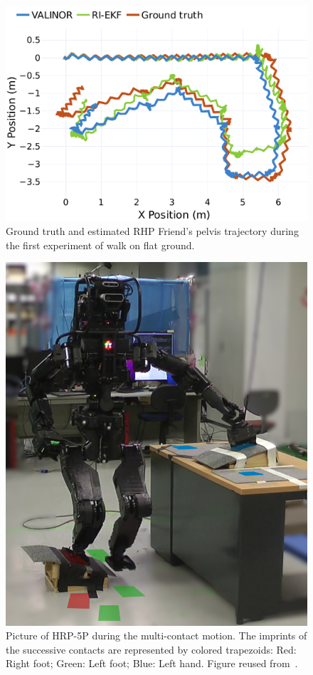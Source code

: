 \documentclass{IJCAS}
\begin{document}
\begin{figure}[!h]
\begin{center}
\includegraphics[width=\columnwidth]{Uploaded/Images/trajectory_rhps1.pdf} 
\vskip -0.5pc
\caption{Ground truth and estimated RHP Friend's pelvis trajectory during the first experiment of walk on flat ground.}\label{fig:trajRhps1_3d}
\end{center}
\vskip -1.5pc
\end{figure}

\begin{figure}[!h]
\begin{center}
\includegraphics[width=0.6\columnwidth]{Uploaded/Images/multiContactExpe.png} 
\vskip -0.5pc
\caption{Picture of HRP-5P during the multi-contact motion. The imprints of the successive contacts are represented by colored trapezoids: Red: Right foot; Green: Left foot; Blue: Left hand. Figure reused from~\cite{Demont2024KineticsObserver}.}\label{fig:hrp5_multicontact}
\end{center}
\vskip -1.5pc
\end{figure}
\end{document}
